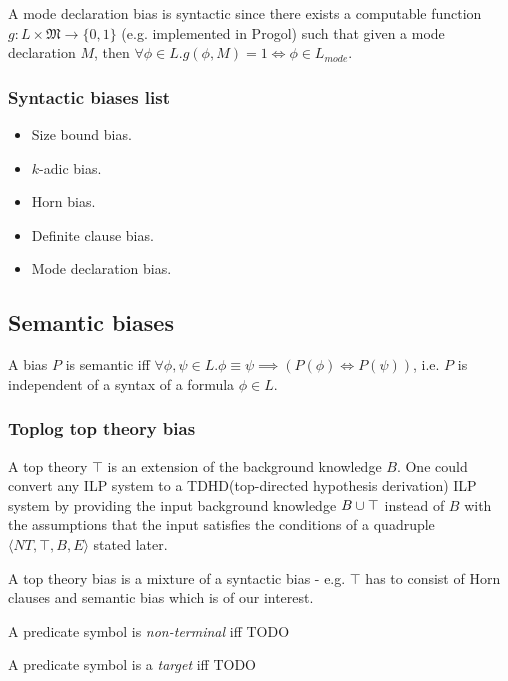 \begin{remark}
A mode declaration bias is syntactic since there exists a computable function $g:L \times \mathfrak{M} \to \{0, 1\}$ (e.g. implemented in Progol\cite{muggleton1995}) such that given a mode declaration $M$, then
$\forall \phi \in L. g(\phi, M)=1 \iff \phi \in L_{mode}$.
\end{remark}

\subsubsection{Syntactic biases list}
\begin{itemize}
\item Size bound bias.
\item $k$-adic bias.
\item Horn bias.
\item Definite clause bias.
\item Mode declaration bias.
\end{itemize}

\subsection{Semantic biases}

\begin{defn}
A bias $P$ is semantic iff $\forall \phi, \psi \in L. \phi \equiv \psi \implies (P(\phi) \iff P(\psi))$, i.e. $P$ is independent of a syntax of a formula $\phi \in L$.
\end{defn}

\subsubsection{Toplog top theory bias\cite{muggleton2008}}
A top theory $\top$ is an extension of the background knowledge $B$. One could convert any ILP system to a TDHD(top-directed hypothesis derivation) ILP system by providing the input background knowledge $B \cup \top$ instead of $B$ with the assumptions that the input satisfies the conditions of a quadruple $\langle NT, \top, B, E \rangle$ stated later.

A top theory bias is a mixture of a syntactic bias - e.g. $\top$ has to consist of Horn clauses and semantic bias which is of our interest.
\begin{defn}
A predicate symbol is \emph{non-terminal} iff TODO
\end{defn}

\begin{defn}
A predicate symbol is a \emph{target} iff TODO
\end{defn}

